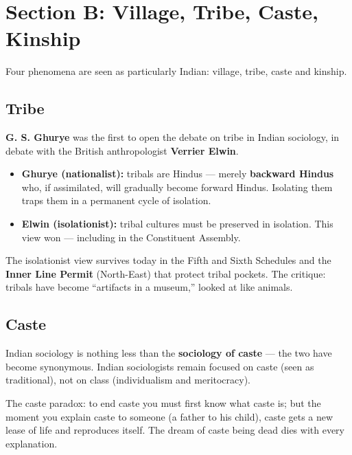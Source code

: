 \section{Section B: Village, Tribe, Caste, Kinship}

Four phenomena are seen as particularly Indian: village, tribe, caste and kinship.

\subsection{Tribe}

\textbf{G. S. Ghurye} was the first to open the debate on tribe in Indian sociology, in debate with the British anthropologist \textbf{Verrier Elwin}.

\begin{ComparisonBox}
\begin{itemize}
\item \textbf{Ghurye (nationalist):} tribals are Hindus --- merely \textbf{backward Hindus} who, if assimilated, will gradually become forward Hindus. Isolating them traps them in a permanent cycle of isolation.
\item \textbf{Elwin (isolationist):} tribal cultures must be preserved in isolation. This view won --- including in the Constituent Assembly.
\end{itemize}
\end{ComparisonBox}

\begin{GovtPolicy}
The isolationist view survives today in the Fifth and Sixth Schedules and the \textbf{Inner Line Permit} (North-East) that protect tribal pockets. The critique: tribals have become ``artifacts in a museum,'' looked at like animals.
\end{GovtPolicy}

\subsection{Caste}

\begin{KeyConcept}
Indian sociology is nothing less than the \textbf{sociology of caste} --- the two have become synonymous. Indian sociologists remain focused on caste (seen as traditional), not on class (individualism and meritocracy).
\end{KeyConcept}

\begin{CriticalPoint}
The caste paradox: to end caste you must first know what caste is; but the moment you explain caste to someone (a father to his child), caste gets a new lease of life and reproduces itself. The dream of caste being dead dies with every explanation.
\end{CriticalPoint}

